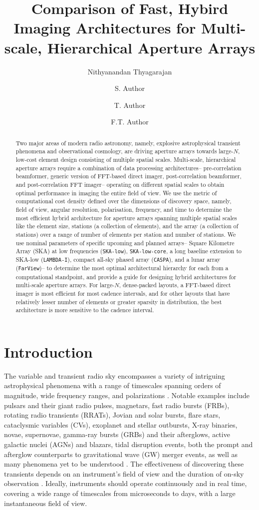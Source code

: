 \documentclass[
  journal=pasa,
  manuscript=article-type,
  year=2020,
  volume=37,
]{cup-journal}
\title{Comparison of Fast, Hybird Imaging Architectures for Multi-scale, Hierarchical Aperture Arrays}
\author{Nithyanandan Thyagarajan}
\affiliation{CSIRO, Space \& Astronomy, P. O. Box 1130, Bentley, WA 6102, Australia}
\author{S. Author}
\affiliation{Second Division, Organization, City, Pincode, State, Country}
\author{T. Author}
\affiliation{Second Division, Organization, City, Pincode, State, Country}
\author{F.T. Author}
\affiliation{Fourth Division, Organization, City, Pincode, State, Country}
\begin{document}
\begin{abstract}
Two major areas of modern radio astronomy, namely, explosive astrophysical transient phenomena and observational cosmology, are driving aperture arrays towards large-$N$, low-cost element design consisting of multiple spatial scales. Multi-scale, hierarchical aperture arrays require a combination of data processing architectures-- pre-correlation beamformer, generic version of FFT-based direct imager, post-correlation beamformer, and post-correlation FFT imager-- operating on different spatial scales to obtain optimal performance in imaging the entire field of view. We use the metric of computational cost density defined over the dimensions of discovery space, namely, field of view, angular resolution, polarisation, frequency, and time to determine the most efficient hybrid architecture for aperture arrays spanning multiple spatial scales like the element size, stations (a collection of elements), and the array (a collection of stations) over a range of number of elements per station and number of stations. We use nominal parameters of specific upcoming and planned arrays-- Square Kilometre Array (SKA) at low frequencies (\texttt{SKA-low}), \texttt{SKA-low-core}, a long baseline extension to SKA-low (\texttt{LAMBDA-I}), compact all-sky phased array (\texttt{CASPA}), and a lunar array (\texttt{FarView})-- to determine the most optimal architectural hierarchy for each from a computational standpoint, and provide a guide for designing hybrid architectures for multi-scale aperture arrays. For large-$N$, dense-packed layouts, a FFT-based direct imager is most efficient for most cadence intervals, and for other layouts that have relatively lesser number of elements or greater sparsity in distribution, the best architecture is more sensitive to the cadence interval.
\end{abstract}

\section{Introduction}

The variable and transient radio sky encompasses a variety of intriguing astrophysical phenomena with a range of timescales spanning orders of magnitude, wide frequency ranges, and polarizations \citep[][and references therein]{Pietka+2015,Chandra+2016}. Notable examples include pulsars and their giant radio pulses, magnetars, fast radio bursts (FRBs), rotating radio transients (RRATs), Jovian and solar bursts, flare stars, cataclysmic variables (CVs), exoplanet and stellar outbursts, X-ray binaries, novae, supernovae, gamma-ray bursts (GRBs) and their afterglows, active galactic nuclei (AGNs) and blazars, tidal disruption events, both the prompt and afterglow counterparts to gravitational wave (GW) merger events, as well as many phenomena yet to be understood \citep{Lorimer+2007,Thyagarajan+2011,Keane2013,Thornton+2013,Bochenek+2020}. The effectiveness of discovering these transients depends on an instrument's field of view and the duration of on-sky observation \citep{Cordes2007}. Ideally, instruments should operate continuously and in real time, covering a wide range of timescales from microseconds to days, with a large instantaneous field of view. 
\end{document}
